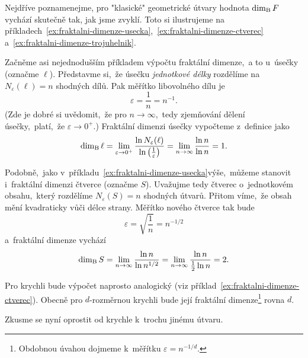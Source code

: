 Nejdříve poznamenejme, pro "klasické" geometrické útvary hodnota $\operatorname{dim_B}{F}$ vychází skutečně tak, jak jsme zvyklí. Toto si ilustrujeme na příkladech~\ref{ex:fraktalni-dimenze-usecka},~\ref{ex:fraktalni-dimenze-ctverec} a~\ref{ex:fraktalni-dimenze-trojuhelnik}.
\begin{example}\label{ex:fraktalni-dimenze-usecka}
    Začněme asi nejednodušším příkladem výpočtu fraktální dimenze,~a to u~úsečky (označme $\ell$). Představme si,~že úsečku \emph{jednotkové délky} rozdělíme na $N_\varepsilon(\ell)=n$ shodných dílů. Pak měřítko libovolného dílu je
    \[\varepsilon=\dfrac{1}{n}=n^{-1}.\]
    (Zde je dobré si uvědomit,~že pro $n\to\infty$,~tedy zjemňování dělení úsečky,~platí,~že $\varepsilon\to 0^+$.) Fraktální dimenzi úsečky vypočteme z~definice jako
    \[\operatorname{dim_B}{\ell}=\lim_{\varepsilon\to 0^+}{\dfrac{\ln{N_\varepsilon(\ell)}}{\ln{\left(\frac{1}{\varepsilon}\right)}}}=\lim_{n\to\infty}{\dfrac{\ln{n}}{\ln{n}}}=1.\]
\end{example}
\begin{example}\label{ex:fraktalni-dimenze-ctverec}
    Podobně,~jako v~příkladu~\ref{ex:fraktalni-dimenze-usecka}\linebreak{}výše,~můžeme stanovit i~fraktální dimenzi čtverce (označme $S$). Uvažujme tedy čtverec o~jednotkovém obsahu,~který rozdělíme $N_\varepsilon(S)=n$ shodných útvarů. Přitom víme,~že obsah mění kvadraticky vůči délce strany. Měřítko nového čtverce tak bude
    \[\varepsilon=\sqrt{\dfrac{1}{n}}=n^{-1/2}\]
    a~fraktální dimenze vychází
    \[\operatorname{dim_B}{S}=\lim_{n\to\infty}{\dfrac{\ln{n}}{\ln{n^{1/2}}}}=\lim_{n\to\infty}{\dfrac{\ln{n}}{\frac{1}{2}\ln{n}}}=2.\]
\end{example}
Pro krychli bude výpočet naprosto analogický (viz příklad~\ref{ex:fraktalni-dimenze-ctverec}). Obecně pro $d$-rozměrnou krychli bude její fraktální dimenze\footnote{Obdobnou úvahou dojmeme k~měřítku $\varepsilon=n^{-1/d}$.} rovna $d$.\par
Zkusme se nyní oprostit od krychle k~trochu jinému útvaru.
